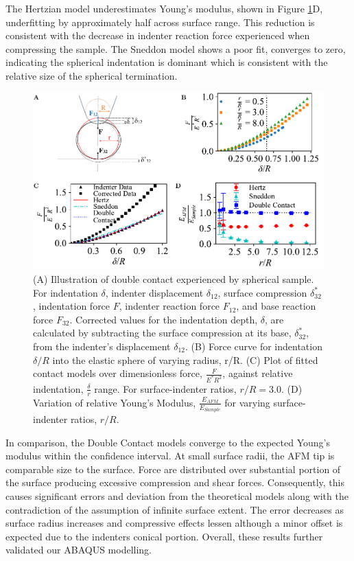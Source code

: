 The Hertzian model underestimates Young's modulus, shown in Figure \ref{fig: Capped-Sphere-Plot}D, underfitting by approximately half across surface range.  This reduction is consistent with the decrease in indenter reaction force experienced when compressing the sample. The Sneddon model shows a poor fit, converges to zero, indicating the spherical indentation is dominant which is consistent with the relative size of the spherical termination. 


\begin{figure}[htp]
    \centering
    \includegraphics[width=1\linewidth]{Figures/Figure2.pdf}
    \caption{\label{fig: Capped-Sphere-Plot} (A) Illustration of double contact experienced by spherical sample. For indentation $\delta$, indenter displacement $\delta_{12}$, surface compression $\delta^*_{32}$, indentation force $F$, indenter reaction force $F_{12}$, and base reaction force $F_{32}$. Corrected values for the indentation depth, $\delta$, are calculated by subtracting the surface compression at its base, $\delta^*_{32}$, from the indenter's displacement $\delta_{12}$. (B) Force curve for indentation $\delta/R$ into the elastic sphere of varying radius, r/R. (C) Plot of fitted contact models over  dimensionless force, $\frac{F}{E^*R^2}$, against relative indentation, $\frac{\delta}{r}$ range. For surface-indenter ratios, $r/R = 3.0$. (D) Variation of relative Young's Modulus, $\frac{E_{AFM}}{E_{Sample}}$ for varying surface-indenter ratios, $r/R$.}
\end{figure}

In comparison, the Double Contact models converge to the expected Young's modulus within the confidence interval. At small surface radii, the AFM tip is comparable size to the surface. Force are distributed over substantial portion of the surface producing excessive compression and shear forces. Consequently, this causes significant errors and deviation from the theoretical models along with the contradiction of the assumption of infinite surface extent. The error decreases as surface radius increases and compressive effects lessen although a minor offset is expected due to the indenters conical portion. Overall, these results further validated our ABAQUS modelling.


